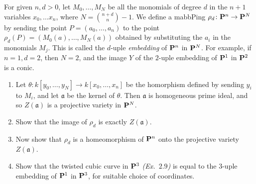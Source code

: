 \documentclass[10pt]{amsart}
\begin{document}
\begin{exercise}[2.12]
    For given $n, d>0$, let
    $M_0,\ldots, M_N$ be all the monomials of degree $d$ in the $n+1$ variables
    $x_0, \ldots x_n$, where $N = \binom{n+d}{n} -1.$ We define a mabbPing
    $\rho_d\colon {\bf P}^n \to {\bf P}^N$ by sending the point $P = (a_0, \ldots, a_n)$
    to the point $\rho_d(P) = (M_0(a), \ldots, M_N(a))$ obtained by substituting
    the $a_i$ in the monomials $M_j$. This is called the $d$-uple \emph{embedding}
    of ${\bf P}^n$ in ${\bf P}^N$. For example, if $n=1, d=2$, then $N= 2$, and the image
    $Y$ of the $2$-uple embedding of ${\bf P}^1$ in ${\bf P}^2$ is a conic. 
    \begin{enumerate}
      \item Let $\theta\colon k[y_0, \ldots, y_N] \to k[x_0, \ldots, x_n]$ be the
        homorphism defined by sending $y_i$ to $M_i$, and let $\mathfrak{a}$ be
        the kernel of $\theta$. Then $\mathfrak{a}$ is homogeneous prime ideal, and
        so $Z(\mathfrak{a})$ is a projective variety in ${\bf P}^N$. 
      \item Show that the image of $\rho_d$ is exactly $Z(\mathfrak{a})$.
      \item Now show that $\rho_d$ is a homeomorphism of ${\bf P}^n$ onto the projective
        variety $Z(\mathfrak{a})$. 
      \item Show that the twisted cubic curve in ${\bf P}^3$
        {\emph{(Ex.\ $2.9$)}} is equal to the $3$-uple
        embedding of ${\bf P}^1$ in ${\bf P}^3$, for suitable choice of coordinates. 
    \end{enumerate}
\end{exercise}
\end{document}
